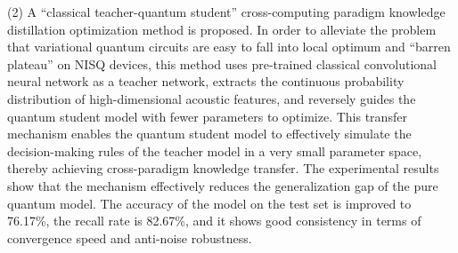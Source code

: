\begin{abstracten}
(2) A ``classical teacher-quantum student'' cross-computing paradigm knowledge distillation optimization method is proposed. In order to alleviate the problem that variational quantum circuits are easy to fall into local optimum and ``barren plateau'' on NISQ devices, this method uses pre-trained classical convolutional neural network as a teacher network, extracts the continuous probability distribution of high-dimensional acoustic features, and reversely guides the quantum student model with fewer parameters to optimize. This transfer mechanism enables the quantum student model to effectively simulate the decision-making rules of the teacher model in a very small parameter space, thereby achieving cross-paradigm knowledge transfer. The experimental results show that the mechanism effectively reduces the generalization gap of the pure quantum model. The accuracy of the model on the test set is improved to 76.17\%, the recall rate is 82.67\%, and it shows good consistency in terms of convergence speed and anti-noise robustness.
\end{abstracten}